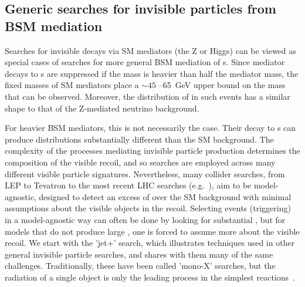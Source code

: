\subsection{Generic searches for invisible particles from BSM mediation}
\label{sec:results_monoXSearches}

Searches for invisible decays via SM mediators (the Z or Higgs) can be viewed as special cases of searches for more general BSM mediation of {\IP}s.
Since mediator decays to {\IP}s are suppressed if the \IP mass is heavier than half the mediator mass, the fixed masses of SM mediators place a $\sim45$ --65~GeV upper bound on the \IP mass that can be observed.
Moreover, the distribution of \MET in such events has a similar shape to that of the Z-mediated neutrino background.



For heavier BSM mediators, this is not necessarily the case.
Their decay to {\IP}s can produce \MET distributions substantially different than the SM background.
The complexity of the processes mediating invisible particle production determines the composition of the visible recoil, and so searches are employed across many different visible particle signatures. 
Nevertheless, many collider searches, from LEP to Tevatron to the most recent LHC searches (e.g.~\cite{Fox:2011fx,Bai:2010hh}), %
aim to be model-agnostic, designed to detect an excess of \MET over the SM background with minimal assumptions about the visible objects in the recoil.
Selecting events (triggering) in a model-agnostic way can often be done by looking for substantial \MET, but for models that do not produce large \MET, one is forced to assume more about the visible recoil.
We start with the 'jet+\MET' search, which illustrates techniques used in other general invisible particle searches, and shares with them many of the same challenges.
Traditionally, these have been called 'mono-X' searches, but the radiation of a single object is only the leading process in the simplest reactions~\cite{Haisch:2013ata}. 

\begin{marginnote}[]
\end{marginnote}


